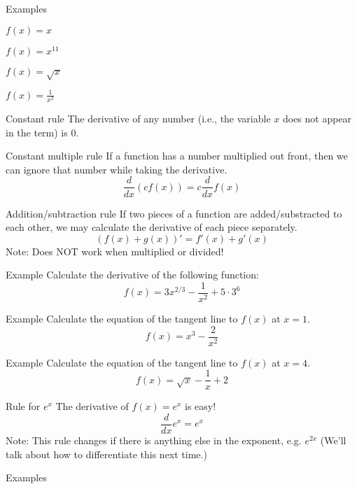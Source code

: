 \documentclass[t]{beamer}
\newenvironment{fpi}
  {\itemize[nolistsep,itemsep=\fill]}
  {\vfill\enditemize}
\begin{document}
\begin{frame}{Examples}
\begin{fpi}
\item $\displaystyle f(x) = x$
\item $\displaystyle f(x) = x^{11}$
\item $\displaystyle f(x) = \sqrt{x}$
\item $\displaystyle f(x) = \frac{1}{x^2}$
\end{fpi}
\end{frame}

\begin{frame}{Constant rule}
The derivative of any number (i.e., the variable $x$ does not appear in the term) is $0$.
\end{frame}

\begin{frame}{Constant multiple rule}
If a function has a number multiplied out front, then we can ignore
that number while taking the derivative.
$$\frac{d}{dx}(c f(x)) = c \frac{d}{dx}f(x)$$
\end{frame}

\begin{frame}{Addition/subtraction rule}
If two pieces of a function are added/substracted to each other, we may
calculate the derivative of each piece separately.
$$(f(x) + g(x))' = f'(x) + g'(x)$$
Note: Does NOT work when multiplied or divided!
\end{frame}

\begin{frame}{Example}
Calculate the derivative of the following function:
$$f(x) = 3x^{2/3} - \frac{1}{x^2} + 5\cdot 3^6$$
\end{frame}

\begin{frame}{Example}
Calculate the equation of the tangent line to $f(x)$ at $x = 1$.
$$f(x) = x^3 - \frac{2}{x^2}$$
\end{frame}

\begin{frame}{Example}
Calculate the equation of the tangent line to $f(x)$ at $x = 4$.
$$f(x) = \sqrt{x} - \frac{1}{x} + 2$$
\end{frame}

\begin{frame}{Rule for $e^x$}
The derivative of $f(x) = e^x$ is easy!
$$\frac{d}{dx} e^x = e^x$$
Note: This rule changes if there is anything else in the exponent,
e.g. $e^{2x}$  (We'll talk about how to differentiate this next time.)
\end{frame}

\begin{frame}{Examples}
\end{frame}
\end{document}
